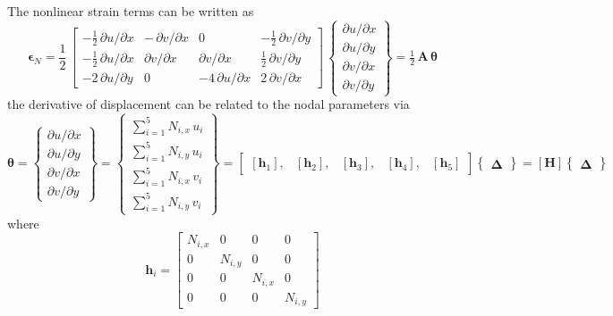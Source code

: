 The nonlinear strain terms can be written as 
\begin{equation}
\boldsymbol{\epsilon}_ N = \frac{1}{2} \, \begin{bmatrix}
-\frac{1}{2} \, \partial u / \partial x &  - \, \partial v / \partial x & 0 & -\frac{1}{2} \, \partial v / \partial y \\
-\frac{1}{2} \, \partial u / \partial x &  \partial v / \partial x & \partial v / \partial x & \frac{1}{2} \, \partial v / \partial y \\
-2 \, \partial u / \partial y & 0 & -4 \, \partial u / \partial x  & 2 \, \partial v / \partial x \end{bmatrix} \, \begin{Bmatrix}
\partial u / \partial x\\
\partial u / \partial y\\
\partial v / \partial x\\
\partial v / \partial y
\end{Bmatrix}
= \tfrac{1}{2} \, \mathbf{A} \, \boldsymbol{\theta}
\end{equation}
the derivative of displacement can be related to the nodal parameters via
\begin{equation}
\boldsymbol{\theta} =  \begin{Bmatrix}
\partial u / \partial x\\
\partial u / \partial y\\
\partial v / \partial x\\
\partial v / \partial y
\end{Bmatrix}
= \begin{Bmatrix}
\sum\nolimits_{i=1}^5 N_{i,x} \, u_i\\
\sum\nolimits_{i=1}^5 N_{i,y} \, u_i\\
\sum\nolimits_{i=1}^5 N_{i,x} \, v_i\\
\sum\nolimits_{i=1}^5 N_{i,y} \, v_i
\end{Bmatrix} 
= \begin{bmatrix}
[\mathbf{h}_1], & [\mathbf{h}_2], & [\mathbf{h}_3], & [\mathbf{h}_4], & [\mathbf{h}_5] 
\end{bmatrix}  \begin{Bmatrix} \boldsymbol{\Delta} \end{Bmatrix}  
= [\mathbf{H}] \begin{Bmatrix} \boldsymbol{\Delta} \end{Bmatrix} 
\end{equation}
where 
\begin{equation}
\mathbf{h}_i = \begin{bmatrix}
N_{i,x} &  0 & 0 & 0 \\
0 & N_{i,y} & 0 & 0  \\
0 & 0 & N_{i,x} & 0 \\
0 & 0 & 0  & N_{i,y} \end{bmatrix} 
\end{equation}
